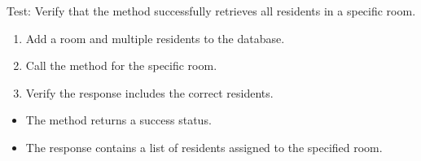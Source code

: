 \documentclass[letterpaper,10pt,english]{sphinxmanual}
\begin{document}
\begin{fulllineitems}
\label{\detokenize{test:test.test_residetnt.test_list_residents_in_room_success}}
\pysigstartsignatures
\pysiglinewithargsret
{}
{}
{}
\pysigstopsignatures
\sphinxAtStartPar
Test: Verify that the method successfully retrieves all residents in a specific room.
\begin{description}
\begin{enumerate}
%
\item {} 
\sphinxAtStartPar
Add a room and multiple residents to the database.

\item {} 
\sphinxAtStartPar
Call the  method for the specific room.

\item {} 
\sphinxAtStartPar
Verify the response includes the correct residents.

\end{enumerate}

\begin{itemize}
\item {} 
\sphinxAtStartPar
The method returns a success status.

\item {} 
\sphinxAtStartPar
The response contains a list of residents assigned to the specified room.

\end{itemize}

\end{description}

\end{fulllineitems}

\end{document}
